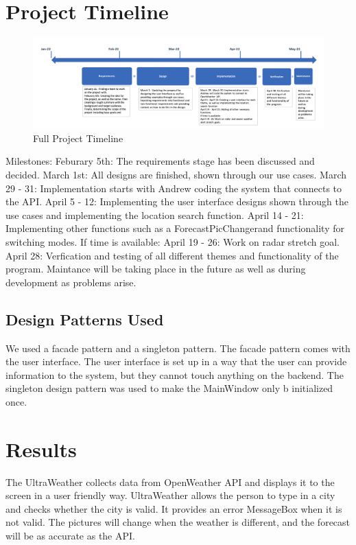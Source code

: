 \documentclass[10pt,conference,onecolumn,compsoc]{IEEEtran}
\begin{document}
\section{Project Timeline}
\begin{figure}[ht!]
\includegraphics[scale = 0.3]{Timeline.png}
\caption{Full Project Timeline}
\label{TimeLine}
\end{figure}
Milestones:
Feburary 5th: The requirements stage has been discussed and decided.
March 1st: All designs are finished, shown through our use cases.
March 29 - 31: Implementation starts with Andrew coding the system that connects to the API.
April 5 - 12: Implementing the user interface designs shown through the use cases and implementing the location search function.
April 14 - 21: Implementing other functions such as a ForecastPicChangerand functionality for switching modes.
If time is available:
April 19 - 26: Work on radar stretch goal.
April 28: Verfication and testing of all different themes and functionality of the program.
Maintance will be taking place in the future as well as during development as problems arise.



\subsection{Design Patterns Used}
We used a facade pattern and a singleton pattern. The facade pattern comes with the user interface. The user interface is set up in a way that the user can provide information to the system, but they cannot touch anything on the backend. The singleton design pattern was used to make the MainWindow only b initialized once.

\section{Results}
The UltraWeather collects data from OpenWeather API and displays it to the screen in a user friendly way. UltraWeather allows the person to type in a city and checks whether the city is valid. It provides an error MessageBox when it is not valid. The pictures will change when the weather is different, and the forecast will be as accurate as the API.
\end{document}
